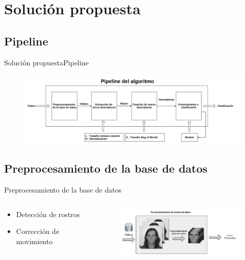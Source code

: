 \documentclass{beamer}
\begin{document}
\section{Solución propuesta}
	\subsection{Pipeline}    
    \begin{frame}{Solución propuesta}{Pipeline}
        \begin{figure}[bt]
    		\centering
            \includegraphics[width=12cm]{imagenes/pipeline.png}
        \end{figure}
    \end{frame}
	
    \subsection{Preprocesamiento de la base de datos}
        \begin{frame}{Preprocesamiento de la base de datos}
        
            \begin{columns}[onlytextwidth]
                \begin{column}{0.4\textwidth}
                    \begin{itemize}
                        \item Detección de rostros
                        \item Corrección de movimiento
                    \end{itemize}
                \end{column}
                \begin{column}{0.6\textwidth}
                    \begin{figure}[bt]
                		\centering
                        \includegraphics[width=7cm]{imagenes/Preprocesamiento.png}
                    \end{figure}
                \end{column}
            \end{columns}
        
        \end{frame}
    
\end{document}
